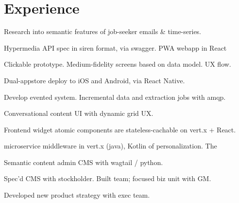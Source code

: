 \documentclass[letterpaper]{deedy-resume} %
\begin{document}
\begin{minipage}[t]{0.66\textwidth} %


\section{Experience}



\vspace{\topsep} %
\begin{tightitemize}
\item Research into semantic features of job-seeker emails \& time-series.
\item Hypermedia API spec in siren format, via swagger. PWA webapp in React
\item Clickable prototype. Medium-fidelity screens based on data model. UX flow.
\item Dual-appstore deploy to iOS and Android, via React Native.
\item Develop evented system. Incremental data and extraction jobs with amqp.
\end{tightitemize}

\sectionspace %



\vspace{\topsep} %
Conversational content UI with dynamic grid UX.
\begin{tightitemize}
\item Frontend widget atomic components are stateless-cachable on vert.x + React.
\item microservice middleware in vert.x (java), Kotlin of personalization. The
\item Semantic content admin CMS with wagtail / python.
\item Spec’d CMS with stockholder. Built team; focused biz unit with GM.
\item Developed new product strategy with exec team.
\end{tightitemize}


\end{minipage}
\end{document}
